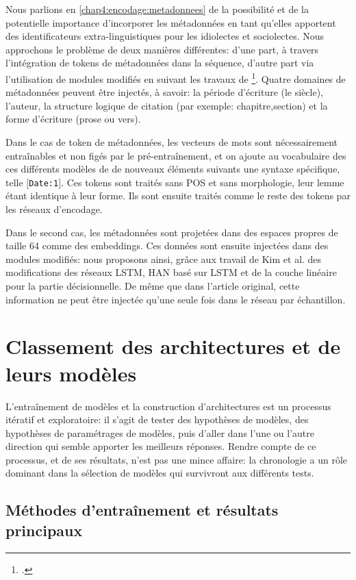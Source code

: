 Nous parlions en \ref{chap4:encodage:metadonnees} de la possibilité et de la potentielle importance d'incorporer les métadonnées en tant qu'elles apportent des identificateurs extra-linguistiques pour les idiolectes et sociolectes. Nous approchons le problème de deux manières différentes: d'une part, à travers l'intégration de tokens de métadonnées dans la séquence, d'autre part via l'utilisation de modules modifiés en suivant les travaux de \footcite{kim_categorical_2019}. Quatre domaines de métadonnées peuvent être injectés, à savoir: la période d'écriture (le siècle), l'auteur, la structure logique de citation (par exemple: chapitre,section) et la forme d'écriture (prose ou vers).

Dans le cas de token de métadonnées, les vecteurs de mots sont nécessairement entraînables et non figés par le pré-entraînement, et on ajoute au vocabulaire des ces différents modèles de de nouveaux éléments suivants une syntaxe spécifique, telle \texttt{$[$Date:1$]$}. Ces tokens sont traités sans POS et sans morphologie, leur lemme étant identique à leur forme. Ils sont ensuite traités comme le reste des tokens par les réseaux d'encodage.

Dans le second cas, les métadonnées sont projetées dans des espaces propres de taille 64 comme des embeddings. Ces données sont ensuite injectées dans des modules modifiés: nous proposons ainsi, grâce aux travail de Kim et al. des modifications des réseaux LSTM, HAN basé sur LSTM et de la couche linéaire pour la partie décisionnelle. De même que dans l'article original, cette information ne peut être injectée qu'une seule fois dans le réseau par échantillon.

\section{Classement des architectures et de leurs modèles}
\label{chap4:part3}

L'entraînement de modèles et la construction d'architectures est un processus itératif et exploratoire: il s'agit de tester des hypothèses de modèles, des hypothèses de paramétrages de modèles, puis d'aller dans l'une ou l'autre direction qui semble apporter les meilleurs réponses. Rendre compte de ce processus, et de ses résultats, n'est pas une mince affaire: la chronologie a un rôle dominant dans la sélection de modèles qui survivront aux différents tests.

\subsection{Méthodes d'entraînement et résultats principaux}

